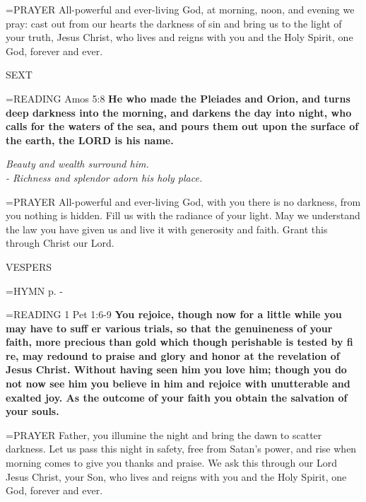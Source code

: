 \hangindent=\parindent \small{PRAYER  All-powerful and ever-living God, at morning, noon, and evening we pray: cast out from our hearts the darkness of sin and bring us to the light of your truth, Jesus Christ, who lives and reigns with you and the Holy Spirit, one God, forever and ever.}

\begin{flushleft}\normalsize SEXT\\\end{flushleft}

\hangindent=\parindent \small{READING} Amos 5:8 \textbf{He who made the Pleiades and Orion, and turns deep darkness into the morning, and darkens the day into night, who calls for the waters of the sea, and pours them out upon the surface of the earth, the LORD is his name.}

\begin{center}
\textit{Beauty and wealth surround him.\\
- Richness and splendor adorn his holy place.}
\end{center}

\hangindent=\parindent \small{PRAYER  All-powerful and ever-living God, with you there is no darkness, from you nothing is hidden. Fill us with the radiance of your light. May we understand the law you have given us and live it with generosity and faith. Grant this through Christ our Lord.}

\begin{flushleft}\normalsize VESPERS\\\end{flushleft}

\hangindent=\parindent \small{\uppercase{HYMN} p.  \pageref{ordinaryTime:fourthHymn} - \pageref{ordinaryTime:sixthHymn} \\}

\hangindent=\parindent \small{READING} 1 Pet 1:6-9 \textbf{You rejoice, though now for a little while you may have to suff er various trials, so that the genuineness of your faith, more precious than gold which though perishable is tested by fi re, may redound to praise and glory and honor at the revelation of Jesus Christ. Without having seen him you love him; though you do not now see him you believe in him and rejoice with unutterable and exalted joy. As the outcome of your faith you obtain the salvation of your souls.  \\}

\hangindent=\parindent \small{PRAYER  Father, you illumine the night and bring the dawn to scatter darkness. Let us pass this night in safety, free from Satan’s power, and rise when morning comes to give you thanks and praise. We ask this}
through our Lord Jesus Christ, your Son, who lives and reigns with you and the Holy Spirit, one God, forever and ever.

